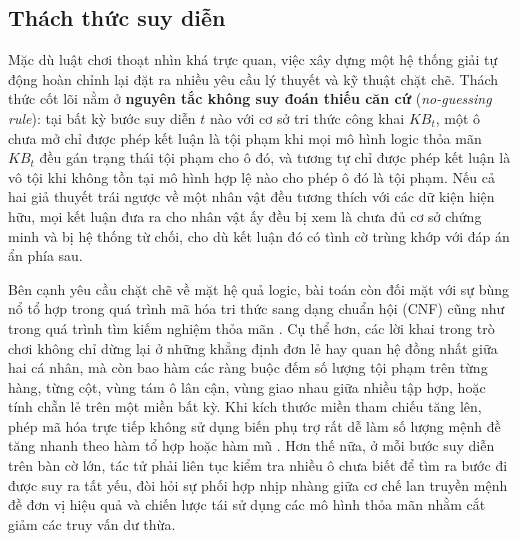 \subsection{Thách thức suy diễn}
Mặc dù luật chơi thoạt nhìn khá trực quan, việc xây dựng một hệ thống giải tự
động hoàn chỉnh lại đặt ra nhiều yêu cầu lý thuyết và kỹ thuật chặt chẽ.
Thách thức cốt lõi nằm ở \textbf{nguyên tắc không suy đoán thiếu căn cứ}
(\textit{no-guessing rule}): tại bất kỳ bước suy diễn $t$ nào với cơ sở tri thức
công khai $KB_t$, một ô chưa mở chỉ được phép kết luận là tội phạm khi mọi mô
hình logic thỏa mãn $KB_t$ đều gán trạng thái tội phạm cho ô đó, và tương tự chỉ
được phép kết luận là vô tội khi không tồn tại mô hình hợp lệ nào cho phép ô đó
là tội phạm. Nếu cả hai giả thuyết trái ngược về một nhân vật đều tương thích với
các dữ kiện hiện hữu, mọi kết luận đưa ra cho nhân vật ấy đều bị xem là chưa đủ
cơ sở chứng minh và bị hệ thống từ chối, cho dù kết luận đó có tình cờ trùng
khớp với đáp án ẩn phía sau.

Bên cạnh yêu cầu chặt chẽ về mặt hệ quả logic, bài toán còn đối mặt với sự bùng
nổ tổ hợp trong quá trình mã hóa tri thức sang dạng chuẩn hội (CNF) cũng như
trong quá trình tìm kiếm nghiệm thỏa mãn \cite{cook1971complexity}. Cụ thể hơn,
các lời khai trong trò chơi không chỉ dừng lại ở những khẳng định đơn lẻ hay quan
hệ đồng nhất giữa hai cá nhân, mà còn bao hàm các ràng buộc đếm số lượng tội phạm
trên từng hàng, từng cột, vùng tám ô lân cận, vùng giao nhau giữa nhiều tập hợp,
hoặc tính chẵn lẻ trên một miền bất kỳ. Khi kích thước miền tham chiếu tăng lên,
phép mã hóa trực tiếp không sử dụng biến phụ trợ rất dễ làm số lượng mệnh đề tăng
nhanh theo hàm tổ hợp hoặc hàm mũ \cite{tseitin1983complexity,sinz2005towards}.
Hơn thế nữa, ở mỗi bước suy diễn trên bàn cờ lớn, tác tử phải liên tục kiểm tra
nhiều ô chưa biết để tìm ra bước đi được suy ra tất yếu, đòi hỏi sự phối hợp
nhịp nhàng giữa cơ chế lan truyền mệnh đề đơn vị hiệu quả và chiến lược tái sử
dụng các mô hình thỏa mãn nhằm cắt giảm các truy vấn dư thừa.

